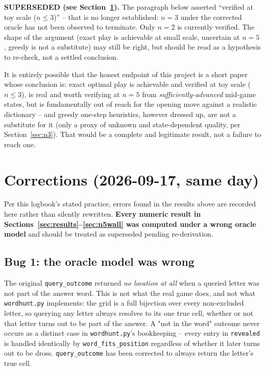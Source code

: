 \documentclass[11pt]{article}
\begin{document}
\textbf{SUPERSEDED (see Section~\ref{sec:corrections}).} The paragraph
below asserted ``verified at toy scale ($n\le3$)'' -- that is no longer
established: $n=3$ under the corrected oracle has not been observed to
terminate. Only $n=2$ is currently verified. The shape of the argument
(exact play is achievable at small scale, uncertain at $n=5$, greedy is
not a substitute) may still be right, but should be read as a hypothesis
to re-check, not a settled conclusion.

It is entirely possible that the honest endpoint of this project is a
short paper whose conclusion is: exact optimal play is achievable and
verified at toy scale ($n\le3$), is real and worth verifying at $n=5$ from
\emph{sufficiently-advanced} mid-game states, but is fundamentally out of
reach for the opening move against a realistic dictionary -- and greedy
one-step heuristics, however dressed up, are not a substitute for it (only
a proxy of unknown and state-dependent quality, per Section~\ref{sec:n3}).
That would be a complete and legitimate result, not a failure to reach one.

\section{Corrections (2026-09-17, same day)}
\label{sec:corrections}

Per this logbook's stated practice, errors found in the results above are
recorded here rather than silently rewritten. \textbf{Every numeric result
in Sections~\ref{sec:results}--\ref{sec:n5wall} was computed under a wrong
oracle model} and should be treated as superseded pending re-derivation.

\subsection{Bug 1: the oracle model was wrong}

The original \texttt{query\_outcome} returned \emph{no location at all}
when a queried letter was not part of the answer word. This is not what
the real game does, and not what \texttt{wordhunt.py} implements: the grid
is a full bijection over every non-excluded letter, so querying any letter
always resolves to its one true cell, whether or not that letter turns out
to be part of the answer. A "not in the word" outcome never occurs as a
distinct case in \texttt{wordhunt.py}'s bookkeeping -- every entry in
\texttt{revealed} is handled identically by \texttt{word\_fits\_position}
regardless of whether it later turns out to be dross. \texttt{query\_outcome}
has been corrected to always return the letter's true cell.
\end{document}
